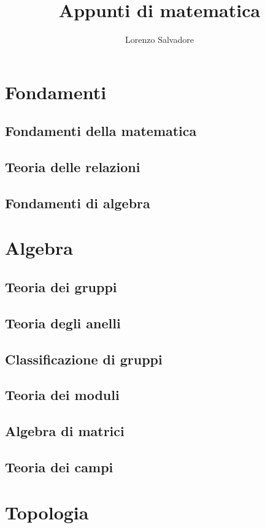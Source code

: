 \documentclass{book}
\title{Appunti di matematica}
\author{Lorenzo Salvadore}
\date{}
\begin{document}
	\maketitle
	\tableofcontents
	\part{Fondamenti}
	\chapter{Fondamenti della matematica}
	
	\chapter{Teoria delle relazioni}
	
	\chapter{Fondamenti di algebra}
	
	\part{Algebra}
	\chapter{Teoria dei gruppi}
	
	\chapter{Teoria degli anelli}
	
	\chapter{Classificazione di gruppi}
	
	\chapter{Teoria dei moduli}
	
	\chapter{Algebra di matrici}
	
	\chapter{Teoria dei campi}
	
	\part{Topologia}
\end{document}
